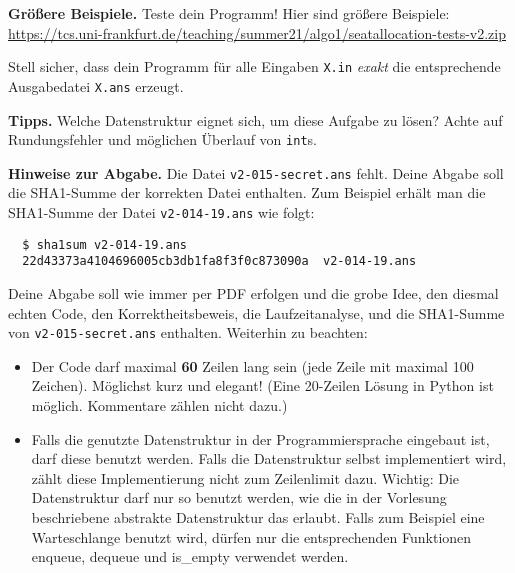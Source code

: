 \documentclass{uebung_cs}
\begin{document}
\begin{aufgabe}
  \textbf{Größere Beispiele.}
  Teste dein Programm! Hier sind größere Beispiele:
  \url{https://tcs.uni-frankfurt.de/teaching/summer21/algo1/seatallocation-tests-v2.zip}
  
  Stell sicher, dass dein Programm für alle Eingaben \texttt{X.in} \emph{exakt} die entsprechende Ausgabedatei \texttt{X.ans} erzeugt.
  
  \textbf{Tipps.}
  Welche Datenstruktur eignet sich, um diese Aufgabe zu lösen? Achte auf Rundungsfehler und möglichen Überlauf von \texttt{int}s.
  
  \textbf{Hinweise zur Abgabe.}
  Die Datei \texttt{v2-015-secret.ans} fehlt.
  Deine Abgabe soll die SHA1-Summe der korrekten Datei enthalten.
  Zum Beispiel erhält man die SHA1-Summe der Datei \texttt{v2-014-19.ans} wie folgt:
  \begin{verbatim}
  $ sha1sum v2-014-19.ans 
  22d43373a4104696005cb3db1fa8f3f0c873090a  v2-014-19.ans
  \end{verbatim}
  Deine Abgabe soll wie immer per PDF erfolgen und die grobe Idee, den diesmal echten Code, den Korrektheitsbeweis, die Laufzeitanalyse, und die SHA1-Summe von \texttt{v2-015-secret.ans} enthalten.
  Weiterhin zu beachten:
  \begin{itemize}
  \item Der Code darf maximal \textbf{60} Zeilen lang sein (jede Zeile mit maximal 100 Zeichen). Möglichst kurz und elegant! (Eine 20-Zeilen Lösung in Python ist möglich. Kommentare zählen nicht dazu.)
  \item Falls die genutzte Datenstruktur in der Programmiersprache eingebaut ist, darf diese benutzt werden. Falls die Datenstruktur selbst implementiert wird, zählt diese Implementierung nicht zum Zeilenlimit dazu. Wichtig: Die Datenstruktur darf nur so benutzt werden, wie die in der Vorlesung beschriebene abstrakte Datenstruktur das erlaubt. Falls zum Beispiel eine Warteschlange benutzt wird, dürfen nur die entsprechenden Funktionen enqueue, dequeue und is\_empty verwendet werden.
  \end{itemize}

\end{aufgabe}
\end{document}
